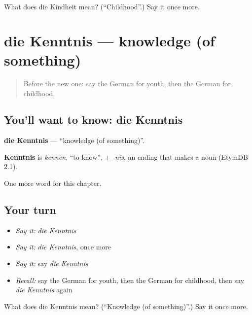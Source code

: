 \begin{tcolorbox}[breakable,colback=teal!4,colframe=teal!35!black,title={Before you move on}]
What does die Kindheit mean? (\textquotedblleft{}Childhood\textquotedblright{}.) Say it once more.
\end{tcolorbox}
\section[die Kenntnis]{die Kenntnis — knowledge (of something)}

\label{lesson:GE-C232-kenntnis}



\begin{quote}
Before the new one: say the German for youth, then the German for childhood.
\end{quote}

\subsection*{You'll want to know: die Kenntnis}
\textbf{die Kenntnis} — \textquotedblleft{}knowledge (of something)\textquotedblright{}.

\begin{cousinweb}
\textbf{Kenntnis} is \emph{kennen}, \textquotedblleft{}to know\textquotedblright{}, + \emph{-nis}, an ending that makes a noun (EtymDB 2.1).
\end{cousinweb}

\begin{grammarlens}[title={What you've built}]
One more word for this chapter.
\end{grammarlens}

\subsection*{Your turn}
\begin{itemize}
\raggedright
  \item \emph{Say it:} \emph{die Kenntnis}
  \item \emph{Say it:} \emph{die Kenntnis}, once more
  \item \emph{Say it:} say \emph{die Kenntnis}
  \item \emph{Recall:} say the German for youth, then the German for childhood, then say \emph{die Kenntnis} again
\end{itemize}

\begin{tcolorbox}[breakable,colback=teal!4,colframe=teal!35!black,title={Before you move on}]
What does die Kenntnis mean? (\textquotedblleft{}Knowledge (of something)\textquotedblright{}.) Say it once more.
\end{tcolorbox}
